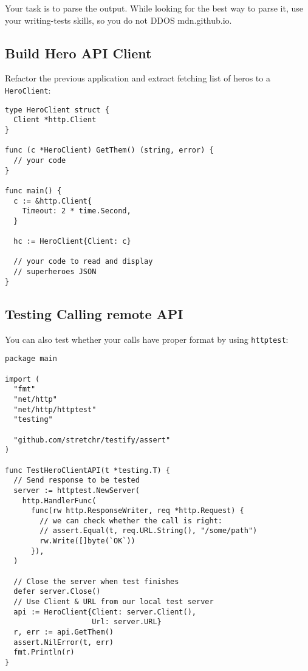 \documentclass[11pt, letterpaper]{article}
\begin{document}
Your task is to parse the output. While looking for the best way to parse it, use your writing-tests skills, so you do not {\small DDOS} mdn.github.io.

\pagebreak
\subsection{Build Hero API Client}

Refactor the previous application and extract fetching list of heros to a \verb|HeroClient|:

\begin{verbatim}
type HeroClient struct {
  Client *http.Client
}

func (c *HeroClient) GetThem() (string, error) {
  // your code
}

func main() {
  c := &http.Client{
    Timeout: 2 * time.Second,
  }

  hc := HeroClient{Client: c}
  
  // your code to read and display 
  // superheroes JSON
}
\end{verbatim}

\subsection{Testing Calling remote {\small API}}

You can also test whether your calls have proper format by using \texttt{httptest}:

\begin{verbatim}
package main

import (
  "fmt"
  "net/http"
  "net/http/httptest"
  "testing"

  "github.com/stretchr/testify/assert"
)

func TestHeroClientAPI(t *testing.T) {
  // Send response to be tested
  server := httptest.NewServer(
    http.HandlerFunc(
      func(rw http.ResponseWriter, req *http.Request) {
        // we can check whether the call is right:
        // assert.Equal(t, req.URL.String(), "/some/path") 
        rw.Write([]byte(`OK`))
      }),
  )

  // Close the server when test finishes
  defer server.Close()
  // Use Client & URL from our local test server
  api := HeroClient{Client: server.Client(),
                    Url: server.URL}
  r, err := api.GetThem()
  assert.NilError(t, err)
  fmt.Println(r)
}
\end{verbatim}
\end{document}

